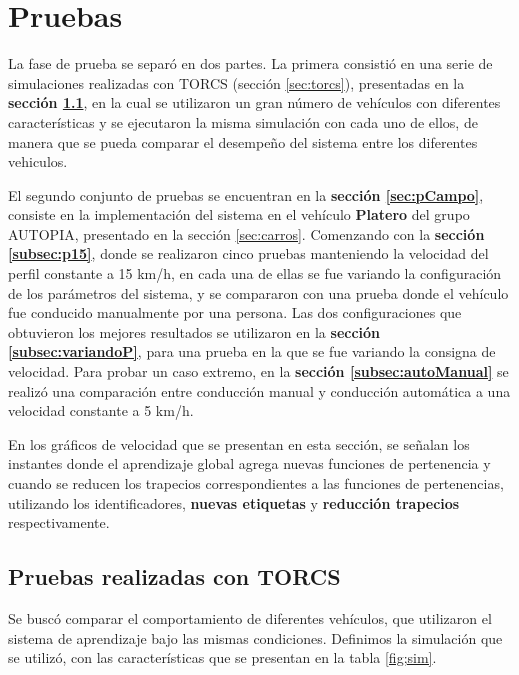 \chapter{Pruebas} 
\label{chap:pruebas}

La fase de prueba se separó en dos partes. La primera consistió en una serie de simulaciones realizadas con TORCS (sección \ref{sec:torcs}), presentadas en la \textbf{sección \ref{sec:pTorcs}}, en la cual se utilizaron un gran número de vehículos con diferentes características y se ejecutaron la misma simulación con cada uno de ellos, de manera que se pueda comparar el desempeño del sistema entre los diferentes vehiculos. 

El segundo conjunto de pruebas se encuentran en la \textbf{sección \ref{sec:pCampo}}, consiste en la implementación del sistema en el vehículo \textbf{Platero} del grupo AUTOPIA, presentado en la sección \ref{sec:carros}. Comenzando con la \textbf{sección \ref{subsec:p15}}, donde se realizaron cinco pruebas manteniendo la velocidad del perfil constante a 15 km/h, en cada una de ellas se fue variando la configuración de los parámetros del sistema, y se compararon con una prueba donde el vehículo fue conducido manualmente por una persona. Las dos configuraciones que obtuvieron los mejores resultados se utilizaron en la \textbf{sección \ref{subsec:variandoP}}, para una prueba en la que se fue variando la consigna de velocidad. Para probar un caso extremo, en la \textbf{sección \ref{subsec:autoManual}} se realizó una comparación entre conducción manual y conducción automática a una velocidad constante a 5 km/h.  

En los gráficos de velocidad que se presentan en esta sección, se señalan los instantes donde el aprendizaje global agrega nuevas funciones de pertenencia y cuando se reducen los trapecios correspondientes a las funciones de pertenencias, utilizando los identificadores, \textbf{nuevas etiquetas} y \textbf{reducción trapecios} respectivamente.
  
\section{Pruebas realizadas con TORCS}
\label{sec:pTorcs}


Se buscó comparar el comportamiento de diferentes vehículos, que utilizaron el sistema de aprendizaje bajo las mismas condiciones. Definimos la simulación que se utilizó, con las características que se presentan en la tabla \ref{fig;sim}.

